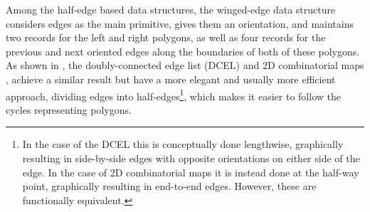 Among the half-edge based data structures, the winged-edge data structure \citep{Baumgart75} considers edges as the main primitive, gives them an orientation, and maintains two records for the left and right polygons, as well as four records for the previous and next oriented edges along the boundaries of both of these polygons.
As shown in , the doubly-connected edge list (DCEL) \citep{Muller78} and 2D combinatorial maps \citep{Edmonds60}, achieve a similar result but have a more elegant and usually more efficient approach, dividing edges into half-edges\footnote{In the case of the DCEL this is conceptually done lengthwise, graphically resulting in side-by-side edges with opposite orientations on either side of the edge.
In the case of 2D combinatorial maps it is instead done at the half-way point, graphically resulting in end-to-end edges.
However, these are functionally equivalent.}, which makes it easier to follow the cycles representing polygons.
